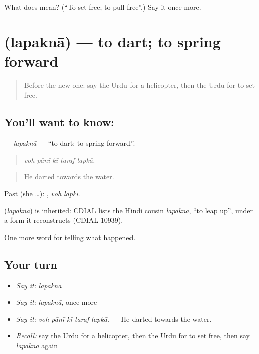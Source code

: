 \begin{tcolorbox}[breakable,colback=teal!4,colframe=teal!35!black,title={Before you move on}]
What does  mean? (\textquotedblleft{}To set free; to pull free\textquotedblright{}.) Say it once more.
\end{tcolorbox}
\section[\texorpdfstring{\ur{لپکنا} (lapaknā)}{لپکنا (lapaknā)}]{ (lapaknā) — to dart; to spring forward}

\label{lesson:UR-C296-lapakna}



\begin{quote}
Before the new one: say the Urdu for a helicopter, then the Urdu for to set free.
\end{quote}

\subsection*{You'll want to know: }
\textbf{} — \emph{lapaknā} — \textquotedblleft{}to dart; to spring forward\textquotedblright{}.

\begin{quote}
    
\end{quote}

\begin{quote}
\emph{voh pānī kī taraf lapkā.}
\end{quote}

\begin{quote}
He darted towards the water.
\end{quote}

Past (she …):  , \emph{voh lapkī}.

\begin{cousinweb}
\textbf{} (\emph{lapaknā}) is inherited: CDIAL lists the Hindi cousin \emph{lapaknā}, \textquotedblleft{}to leap up\textquotedblright{}, under a form it reconstructs (CDIAL 10939).
\end{cousinweb}

\begin{grammarlens}[title={What you've built}]
One more word for telling what happened.
\end{grammarlens}

\subsection*{Your turn}
\begin{itemize}
\raggedright
  \item \emph{Say it:} \emph{lapaknā}
  \item \emph{Say it:} \emph{lapaknā}, once more
  \item \emph{Say it:} \emph{voh pānī kī taraf lapkā.} — He darted towards the water.
  \item \emph{Recall:} say the Urdu for a helicopter, then the Urdu for to set free, then say \emph{lapaknā} again
\end{itemize}

